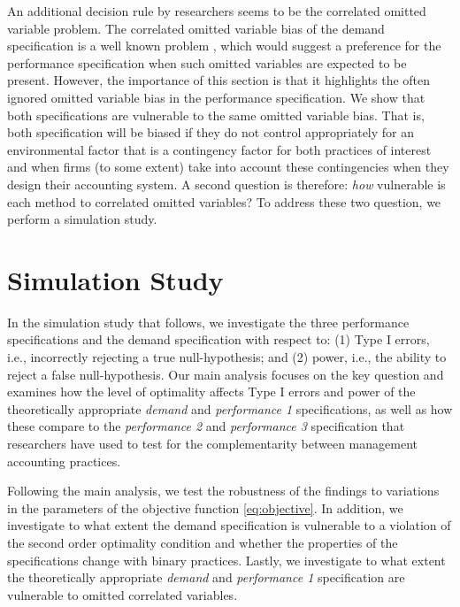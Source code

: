 \documentclass[12pt]{article}
\begin{document}
An additional decision rule by researchers seems to be the correlated omitted variable problem. The correlated omitted variable bias of the demand specification is a well known problem \citep{grabner_management_2013,arora_testing_1996,carree_note_2011}, which would suggest a preference for the performance specification when such omitted variables are expected to be present. However, the importance of this section is that it highlights the often ignored omitted variable bias in the performance specification. We show that both specifications are vulnerable to the same omitted variable bias. That is, both specification will be biased if they do not control appropriately for an environmental factor that is a contingency factor for both practices of interest and when firms (to some extent) take into account these contingencies when they design their accounting system. A second question is therefore: \emph{how} vulnerable is each method to correlated omitted variables? To address these two question, we perform a simulation study.

\section{Simulation Study}\label{simulation-study}

In the simulation study that follows, we investigate the three performance specifications and the demand specification with respect to: (1) Type I errors, i.e., incorrectly rejecting a true null-hypothesis; and (2) power, i.e., the ability to reject a false null-hypothesis. Our main analysis focuses on the key question and examines how the level of optimality affects Type I errors and power of the theoretically appropriate \emph{demand} and \emph{performance 1} specifications, as well as how these compare to the \emph{performance 2} and \emph{performance 3} specification that researchers have used to test for the complementarity between management accounting practices.  

Following the main analysis, we test the robustness of the findings to variations in the parameters of the objective function \eqref{eq:objective}. In addition, we investigate to what extent the demand specification is vulnerable to a violation of the second order optimality condition and whether the properties of the specifications change with binary practices. Lastly, we investigate to what extent the theoretically appropriate \emph{demand} and \emph{performance 1} specification are vulnerable to omitted correlated variables. 
\end{document}
